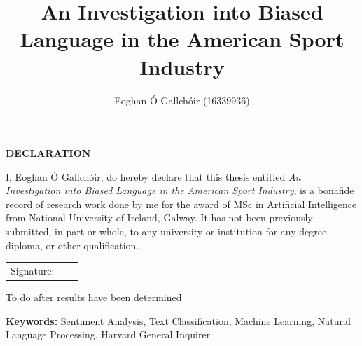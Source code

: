 \documentclass[oneside,12pt]{Classes/RoboticsLaTeX}
\title{\Large{An Investigation into Biased Language in the American Sport Industry}}
\author{Eoghan Ó Gallchóir (16339936)}
\begin{document}
\begin{spacing}{1}
\maketitle
\end{spacing}

\newpage\null\thispagestyle{empty}\newpage

\setcounter{secnumdepth}{3}
\setcounter{tocdepth}{3}

\frontmatter

\textbf{DECLARATION} 

I, Eoghan Ó Gallchóir, do hereby declare that this thesis entitled {\it An Investigation into Biased Language in the American Sport Industry},
 is a bonafide record of research work done by me for the award of MSc in Artificial Intelligence from National University of Ireland, Galway. 
 It has not been previously submitted, in part or whole, to any university or institution for any degree, diploma, or other qualification. 
\newline

\begin{tabular}{@{}p{.5in}p{4in}@{}}
Signature: & ~~\hrulefill \\
\end{tabular}
\newpage


%
%


\begin{abstracts}
To do after results have been determined

\textbf{Keywords: } Sentiment Analysis, Text Classification, Machine Learning, Natural Language Processing, Harvard General Inquirer
\end{abstracts}


\tableofcontents
\listoffigures
\listoftables
\printglossary[title=List of Acronyms,type=\acronymtype]
\end{document}
